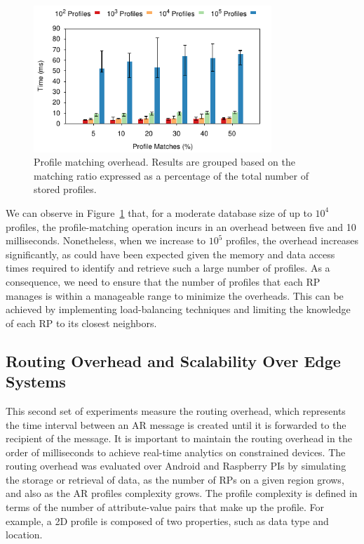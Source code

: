 \begin{figure}[htb!]
  \centering
    \includegraphics[width=0.8\textwidth]{Figures/profileQuery.pdf}
  \caption{Profile matching overhead. Results are grouped based on the matching ratio expressed as a percentage of the total number of stored profiles.} \label{fig:profileQuery}
\end{figure}

We can observe in Figure~\ref{fig:profileQuery} that, for a moderate database size of up to $10^4$ profiles, the profile-matching operation incurs in an overhead between five and 10 milliseconds. Nonetheless, when we increase to $10^5$ profiles, the overhead increases significantly, as could have been expected given the memory and data access times required to identify and retrieve such a large number of profiles. As a consequence, we need to ensure that the number of profiles that each RP manages is within a manageable range to minimize the overheads. This can be achieved by implementing load-balancing techniques and limiting the knowledge of each RP to its closest neighbors. 


\subsection{Routing Overhead and Scalability Over Edge Systems}

This second set of experiments measure the routing overhead, which represents the time interval between an AR message is created until it is forwarded to the recipient of the message. It is important to maintain the routing overhead in the order of milliseconds to achieve real-time analytics on constrained devices. The routing overhead was evaluated over Android and Raspberry PIs by simulating the storage or retrieval of data, as the number of RPs on a given region grows, and also as the AR profiles complexity grows. The profile complexity is defined in terms of the number of attribute-value pairs that make up the profile. For example, a 2D profile is composed of two properties, such as data type and location.


